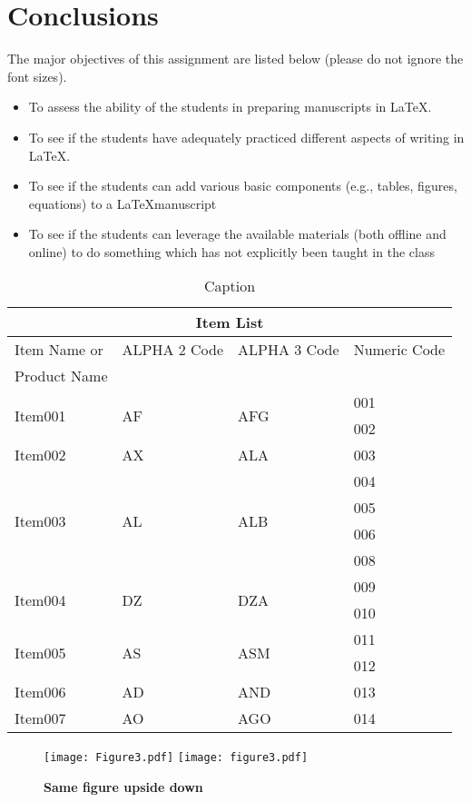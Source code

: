 \documentclass[18pt, a4paper]{article} %
\begin{document}
    \section{Conclusions}
    The major objectives of this assignment are listed below (please do not ignore
    the font sizes).
    \begin{itemize}
        \item \huge {To assess the ability of the students in preparing
            manuscripts in} \LaTeX.
        \item \Large {To see if the students have adequately practiced different
            aspects of writing in} \LaTeX.
        \item \large{To see if the students can add various basic components (e.g., tables,
            figures, equations) to a \LaTeX manuscript}
        \item To see if the students can leverage the available materials (both offline and
            online) to do something which has not explicitly been taught in the class
    \end{itemize}
    
    \pagebreak
    
    \begin{table}[h]
        \centering
        \begin{tabular}{|l||l|l|l|}
     \hline
     \multicolumn{4}{|c|}{Item List} \\
     \hline
     Item  Name  or  & ALPHA 2 Code & ALPHA 3 Code & Numeric Code \\
     Product Name & & & \\
     \hline
     \multirow{2}{*}{Item001} & \multirow{2}{*}{AF} & \multirow{2}{*}{AFG} & 001 \\
      &  &  & 002 \\
      \hline
     Item002 & AX & ALA & 003 \\
     \hline
     \multirow{4}{*}{Item003} & \multirow{4}{*}{AL} & \multirow{4}{*}{ALB} & 004 \\
      &  &  & 005 \\
      &  &  & 006 \\
      &  &  & 008 \\
      \hline
     \multirow{2}{*}{Item004} & \multirow{2}{*}{DZ} & \multirow{2}{*}{DZA} & 009 \\
      &  &  & 010 \\
      \hline
     \multirow{2}{*}{Item005} & \multirow{2}{*}{AS} & \multirow{2}{*}{ASM} & 011 \\
      &  &  & 012 \\
      \hline
     Item006 & AD & AND & 013 \\
     \hline
     Item007 & AO & AGO & 014 \\
     \hline
     \hline

\end{tabular}
        \caption{Caption}
        \label{tab: table}
    \end{table}
    
    \pagebreak
    
    \begin{figure}[t]
		\centering
		\scalebox{1}{-1} {\texttt{[image: Figure3.pdf]}}
		\texttt{[image: figure3.pdf]}
		
		\caption{\textbf{Same figure upside down}}
		\label{fig: image}
	\end{figure}
\end{document}
